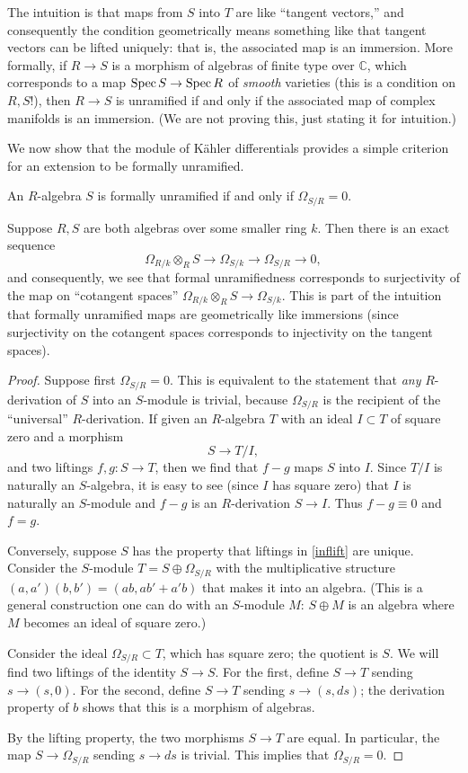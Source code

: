 The intuition is that maps from $S$ into $T$ are like ``tangent vectors,'' and
consequently the condition geometrically means something like that tangent
vectors can be lifted uniquely: that is, the associated map is an immersion.
More formally, if $R\to  S$ is a morphism of algebras of finite type
over $\mathbb{C}$, which corresponds to a map $\operatorname{Spec} S \to \operatorname{Spec} R$ of
\emph{smooth} varieties (this is a condition on $R, S$!), then $R \to S$ is
unramified if and only if the  associated map of complex manifolds is an
immersion. (We are not proving this, just stating it for intuition.)

We now show that the module of K\"ahler differentials provides a simple
criterion for an extension to be formally unramified.
\begin{proposition} \label{formalunrmeansomegazero}
An $R$-algebra $S$ is formally unramified if and only if $\Omega_{S/R} = 0$.
\end{proposition} 

Suppose $R, S$ are both algebras over some smaller ring $k$. 
Then there is an exact sequence
\[ \Omega_{R/k}\otimes_R S \to \Omega_{S/k} \to \Omega_{S/R} \to 0,  \]
and consequently, we see that formal unramifiedness corresponds to surjectivity
of the map on ``cotangent spaces'' $\Omega_{R/k} \otimes_R S \to \Omega_{S/k}$. 
This is part of the intuition that formally unramified maps are geometrically
like immersions (since surjectivity on the cotangent spaces corresponds to
injectivity on the tangent spaces).

\begin{proof} 
Suppose first $\Omega_{S/R}=0$. This is equivalent to the statement that
\emph{any} $R$-derivation of $S$ into an $S$-module is trivial, because
$\Omega_{S/R}$ is the recipient of the ``universal'' $R$-derivation.
If given an $R$-algebra $T$ with an ideal $I \subset T$ of square zero and a
morphism 
\[ S \to T/I,  \]
and two liftings $f,g: S \to T$, then we find that $f-g$ maps $S$ into $I$.
Since $T/I$ is naturally an $S$-algebra, it is easy to see (since $I$ has
square zero) that $I$ is naturally an $S$-module and $f-g$ is an
$R$-derivation $S \to I$. 
Thus $f-g \equiv 0$ and $f=g$.

Conversely, suppose $S$ has the property that liftings in \eqref{inflift} are
unique.
Consider the $S$-module $T=S \oplus \Omega_{S/R}$ with the multiplicative
structure $(a,a')(b,b') = (ab, ab' + a'b)$ that makes it into an algebra.
(This is a general construction one can do with an $S$-module $M$: $S \oplus
M$ is an algebra where $M$ becomes an ideal of square zero.)

Consider the ideal $\Omega_{S/R} \subset T$, which has
square zero; the quotient is $S$. We will find two liftings of the identity $S
\to S$. For the first, define $S \to T$ sending $s \to (s,0)$. For the second,
define $S \to T$ sending $s \to (s, ds)$; the derivation property of $b$ shows
that this is a morphism of algebras.

By the lifting property, the two morphisms $S \to T$ are equal. In particular,
the map $S \to \Omega_{S/R}$ sending $s \to ds$ is trivial. This implies that
$\Omega_{S/R}=0$.

\end{proof} 

